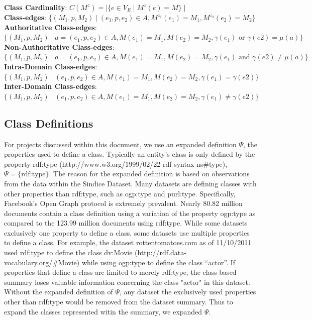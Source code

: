 \documentclass[11pt,onecolumn]{article}
\begin{document}
{\bf Class Cardinality}: $C(M^z) = \mid \{ e \in V_E \mid M^z(e) = M \} \mid $\\

{\bf Class-edges}: $\{(M_1,p,M_2) \mid (e_1,p,e_2) \in A, M^{z_1}(e_1) = M_1, M^{z_2}(e_2) = M_2 \}$\\
{\bf Authoritative Class-edges}: $\{(M_1,p,M_2) \mid a =(e_1,p,e_2) \in A, M(e_1) = M_1, M(e_2) = M_2, \gamma(e_1) \mbox{ or } \gamma(e2) = \mu(a) \}$\\
{\bf Non-Authoritative Class-edges}: $\{(M_1,p,M_2) \mid a = (e_1,p,e_2) \in A, M(e_1) = M_1 , M(e_2) = M_2, \gamma(e_1) \mbox{ and } \gamma(e2) \neq \mu(a) \}$\\
{\bf Intra-Domain Class-edges}: $\{(M_1,p,M_2) \mid (e_1,p,e_2) \in A, M(e_1) = M_1,  M(e_2) = M_2, \gamma(e_1) = \gamma(e2) \}$\\

{\bf Inter-Domain Class-edges}: $\{(M_1,p,M_2) \mid (e_1,p,e_2) \in A, M(e_1) = M_1, M(e_2) = M_2, \gamma(e_1) \ne \gamma(e2) \}$\\


\subsection{Class Definitions}

For projects discussed within this document, we use an expanded definition $\Psi$, the properties used to define a class.  Typically an entity's class is only defined by the property rdf:type (http://www.w3.org/1999/02/22-rdf-syntax-ns\#type), $\Psi = \{\mbox{rdf:type}\}$.  The reason for the expanded definition is based on observations from the data within the Sindice Dataset.  Many datasets are defining classes with other properties than rdf:type, such as ogp:type and purl:type.  Specifically, Facebook's Open Graph protocol is extremely prevalent.  Nearly 80.82 million documents contain a class definition using a variation of the property ogp:type as compared to the 123.99 million documents using rdf:type.  While some datasets exclusively one property to define a class, some datasets use multiple properties to define a class.  For example, the dataset rottentomatoes.com as of 11/10/2011 used rdf:type to define the class dv:Movie (http://rdf.data-vocabulary.org/\#Movie) while using ogp:type to define the class “actor”.  If properties that define a class are limited to merely rdf:type, the class-based summary loses valuable information concerning the class "actor" in this dataset.  Without the expanded definition of $\Psi$, any dataset the exclusively used  properties other than rdf:type would be removed from the dataset summary.  Thus to expand the classes represented witin the summary, we expanded $\Psi$.
\end{document}
